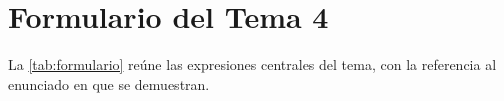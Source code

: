 \clearpage
\appendix
\renewcommand{\thesection}{\Alph{section}}
\section{Formulario del Tema 4}\label{sec:formulario}

La \cref{tab:formulario} reúne las expresiones centrales del tema, con la referencia al enunciado en que se demuestran.

\begingroup
\centering
{}
\label{tab:formulario}
\small
\renewcommand{\arraystretch}{1.38}
